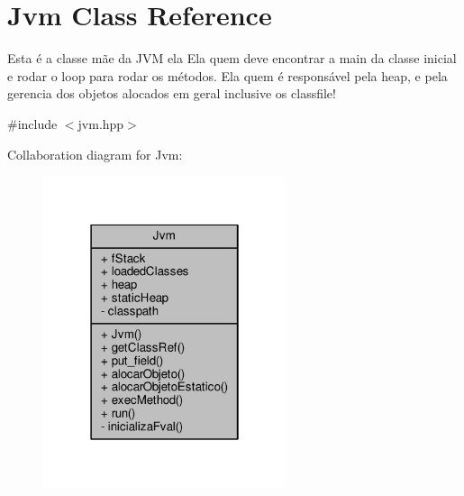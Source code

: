 \hypertarget{classJvm}{\section{Jvm Class Reference}
\label{classJvm}
}


Esta é a classe mãe da J\+V\+M ela Ela quem deve encontrar a main da classe inicial e rodar o loop para rodar os métodos. Ela quem é responsável pela heap, e pela gerencia dos objetos alocados em geral inclusive os classfile!  




{\ttfamily \#include $<$jvm.\+hpp$>$}



Collaboration diagram for Jvm\+:
\nopagebreak
\begin{figure}[H]
\begin{center}
\leavevmode
\includegraphics[width=202pt]{classJvm__coll__graph}
\end{center}
\end{figure}
